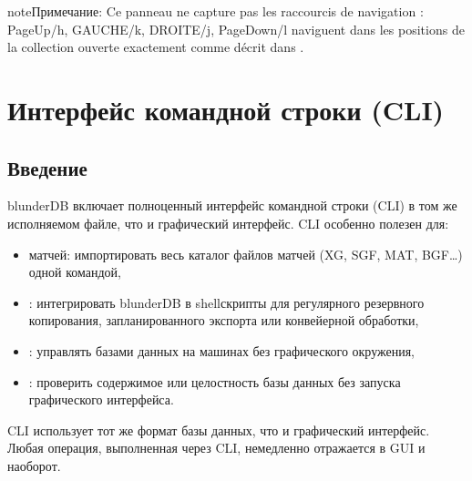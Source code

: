 \documentclass[letterpaper,10pt,russian]{sphinxmanual}
\begin{document}
\begin{sphinxadmonition}{note}{Примечание:}
\sphinxAtStartPar
Ce panneau ne capture pas les raccourcis de navigation :
PageUp/h, GAUCHE/k, DROITE/j, PageDown/l naviguent dans les positions de
la collection ouverte exactement comme décrit dans
{\hyperref[\detokenize{raccourcis:raccourcis-navigation}]{}}.
\end{sphinxadmonition}

\sphinxstepscope


\section{Интерфейс командной строки (CLI)}
\label{\detokenize{cli:interface-en-ligne-de-commande-cli}}\label{\detokenize{cli:cli}}\label{\detokenize{cli::doc}}

\subsection{Введение}
\label{\detokenize{cli:introduction}}
\sphinxAtStartPar
blunderDB включает полноценный интерфейс командной строки (CLI) в том же исполняемом файле, что и графический интерфейс. CLI особенно полезен для:
\begin{itemize}
\item {} 
\sphinxAtStartPar
{} матчей: импортировать весь каталог файлов матчей (XG, SGF, MAT, BGF…) одной командой,

\item {} 
\sphinxAtStartPar
{}: интегрировать blunderDB в shell\sphinxhyphen{}скрипты для регулярного резервного копирования, запланированного экспорта или конвейерной обработки,

\item {} 
\sphinxAtStartPar
{}: управлять базами данных на машинах без графического окружения,

\item {} 
\sphinxAtStartPar
{}: проверить содержимое или целостность базы данных без запуска графического интерфейса.

\end{itemize}

\sphinxAtStartPar
CLI использует тот же формат базы данных, что и графический интерфейс. Любая операция, выполненная через CLI, немедленно отражается в GUI и наоборот.
\end{document}
